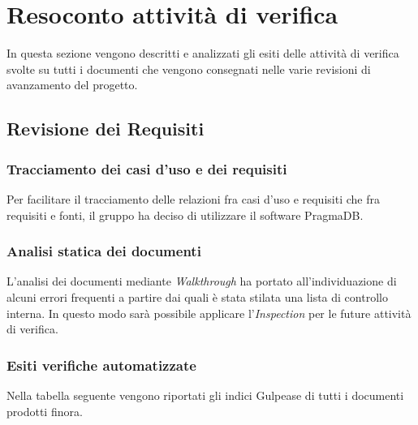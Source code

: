 \section{Resoconto attività di verifica}
In questa sezione vengono descritti e analizzati gli esiti delle attività
di verifica svolte su tutti i documenti che vengono consegnati nelle varie 
revisioni di avanzamento del progetto.

\subsection{Revisione dei Requisiti}
\subsubsection{Tracciamento dei casi d'uso e dei requisiti}
Per facilitare il tracciamento delle relazioni fra casi d'uso e requisiti che
fra requisiti e fonti, il gruppo ha deciso di utilizzare il software PragmaDB.

\subsubsection{Analisi statica dei documenti}
L'analisi dei documenti mediante \textit{Walkthrough}\glo{} ha portato 
all'individuazione di alcuni errori frequenti a partire dai quali è stata 
stilata una lista di controllo interna. In questo modo sarà possibile applicare
l'\textit{Inspection}\glo{} per le future attività di verifica.

\subsubsection{Esiti verifiche automatizzate}
Nella tabella seguente vengono riportati gli indici Gulpease\glo{} di tutti
i documenti prodotti finora.

	
